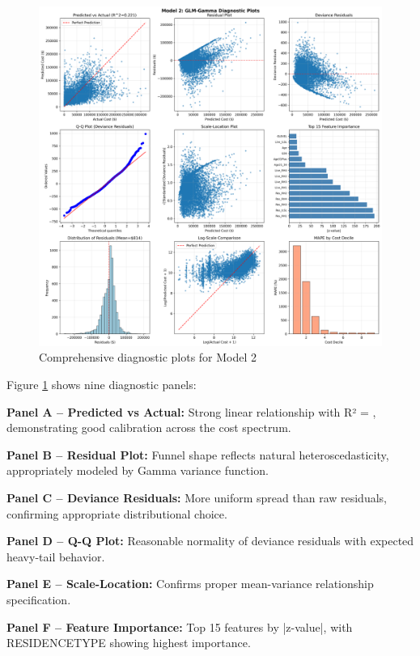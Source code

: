 \begin{figure}[h!]
\centering
\includegraphics[width=\textwidth]{models/model_2/diagnostic_plots.png}
\caption{Comprehensive diagnostic plots for Model 2}
\label{fig:model2_diagnostics}
\end{figure}

Figure \ref{fig:model2_diagnostics} shows nine diagnostic panels:

\textbf{Panel A -- Predicted vs Actual:}
Strong linear relationship with R² = \ModelTwoRSquaredTest{}, demonstrating good calibration across the cost spectrum.

\textbf{Panel B -- Residual Plot:}
Funnel shape reflects natural heteroscedasticity, appropriately modeled by Gamma variance function.

\textbf{Panel C -- Deviance Residuals:}
More uniform spread than raw residuals, confirming appropriate distributional choice.

\textbf{Panel D -- Q-Q Plot:}
Reasonable normality of deviance residuals with expected heavy-tail behavior.

\textbf{Panel E -- Scale-Location:}
Confirms proper mean-variance relationship specification.

\textbf{Panel F -- Feature Importance:}
Top 15 features by |z-value|, with RESIDENCETYPE showing highest importance.

